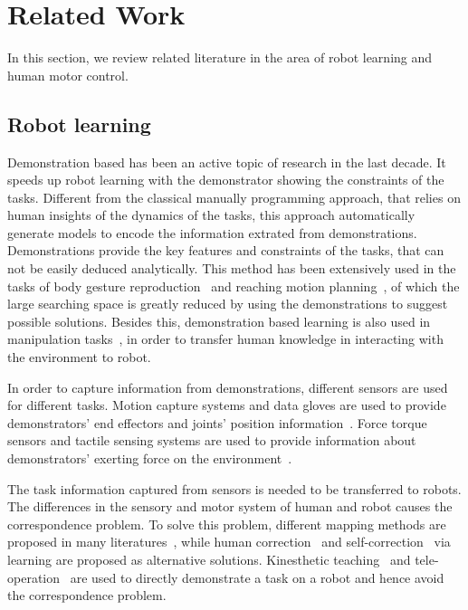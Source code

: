 \section{Related Work}
\label{sec:related}
In this section, we review related literature in the area of robot learning and human motor control.


\subsection{Robot learning}
\label{sec:imitation}
Demonstration based has been an active topic of research in the last decade. It speeds up robot learning with the demonstrator showing the constraints of the tasks.
Different from the classical manually programming approach, that relies on human insights of the dynamics of the tasks, this approach automatically generate models to encode the information extrated from demonstrations. Demonstrations provide the key features and constraints of the tasks, that can not be easily deduced analytically. This method has been extensively used in the tasks of body gesture reproduction~\cite{hsiao2005imitation,calinon2010learning,kulic2012incremental} and reaching motion planning~\cite{Ekvall07,shukla2012coupled,mohammad2014learning}, of which the large searching space is greatly reduced by using the demonstrations to suggest possible solutions. Besides this, demonstration based learning is also used in manipulation tasks~\cite{petkos2006learning,sauser2011iterative,Miao2014}, in order to transfer human knowledge in interacting with the environment to robot.

In order to capture information from demonstrations, different sensors are used for different tasks. Motion capture systems and data gloves are used to provide demonstrators' end effectors and joints' position information~\cite{calinon2007incremental,asfour2008imitation,kulic2012incremental,bidan2013robio}. Force torque sensors and tactile sensing systems are used to provide information about demonstrators' exerting force on the environment~\cite{sauser2011iterative,Miao2014}.

The task information captured from sensors is needed to be transferred to robots. The differences in the sensory and motor system of human and robot causes the correspondence problem.
To solve this problem, different mapping methods are proposed in many literatures~\cite{asfour2008imitation,koenemann2012whole,kulic2012incremental}, while human correction~\cite{calinon2007incremental,sauser2011iterative,romano2011human} and self-correction~\cite{bidan2013robio} via learning are proposed as alternative solutions. Kinesthetic teaching~\cite{korkinof2013online,pais2014encoding} and tele-operation~\cite{Fischer98} are used to directly demonstrate a task on a robot and hence avoid the correspondence problem.


